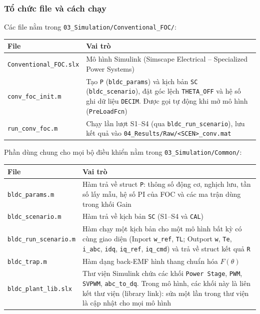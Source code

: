 \subsubsection{Tổ chức file và cách chạy}\label{sec:5.3.1}

Các file nằm trong \texttt{03\_Simulation/Conventional\_FOC/}:

\begin{center}\small
\begin{tabularx}{\linewidth}{@{}l>{\raggedright\arraybackslash}X@{}}
\toprule
File & Vai trò \\ \midrule
\texttt{Conventional\_FOC.slx} & Mô hình Simulink (Simscape Electrical – Specialized Power Systems) \\
\texttt{conv\_foc\_init.m} & Tạo \texttt{P} (\texttt{bldc\_params}) và kịch bản \texttt{SC} (\texttt{bldc\_scenario}), đặt góc lệch \texttt{THETA\_OFF} và hệ số ghi dữ liệu \texttt{DECIM}. Được gọi tự động khi mở mô hình (\texttt{PreLoadFcn}) \\
\texttt{run\_conv\_foc.m} & Chạy lần lượt S1–S4 (qua \texttt{bldc\_run\_scenario}), lưu kết quả vào \texttt{04\_Results/Raw/<SCEN>\_conv.mat} \\
\bottomrule
\end{tabularx}
\end{center}

Phần dùng chung cho mọi bộ điều khiển nằm trong \texttt{03\_Simulation/Common/}:

\begin{center}\small
\begin{tabularx}{\linewidth}{@{}l>{\raggedright\arraybackslash}X@{}}
\toprule
File & Vai trò \\ \midrule
\texttt{bldc\_params.m} & Hàm trả về struct \texttt{P}: thông số động cơ, nghịch lưu, tần số lấy mẫu, hệ số PI của FOC và các ma trận dùng trong khối Gain \\
\texttt{bldc\_scenario.m} & Hàm trả về kịch bản \texttt{SC} (S1–S4 và \texttt{CAL}) \\
\texttt{bldc\_run\_scenario.m} & Hàm chạy một kịch bản cho một mô hình bất kỳ có cùng giao diện (Inport \texttt{w\_ref}, \texttt{TL}; Outport \texttt{w}, \texttt{Te}, \texttt{i\_abc}, \texttt{idq}, \texttt{iq\_ref}, \texttt{iq\_cmd}) và trả về struct kết quả \texttt{R} \\
\texttt{bldc\_trap.m} & Hàm dạng back-EMF hình thang chuẩn hóa $F(\theta)$ \\
\texttt{bldc\_plant\_lib.slx} & Thư viện Simulink chứa các khối \texttt{Power Stage}, \texttt{PWM}, \texttt{SVPWM}, \texttt{abc\_to\_dq}. Trong mô hình, các khối này là liên kết thư viện (library link): sửa một lần trong thư viện là cập nhật cho mọi mô hình \\
\bottomrule
\end{tabularx}
\end{center}

